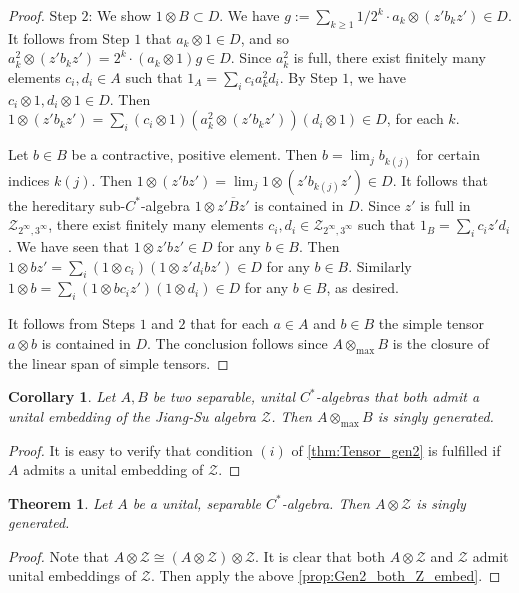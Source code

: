 \documentclass{amsart}
\newtheorem{thm}[thmCt]{Theorem}
\newtheorem{cor}[corCt]{Corollary}
\theoremstyle{definition}
\begin{document}
\begin{proof}
    Step $2$: We show $1\otimes B\subset D$.
    We have $g:=\sum_{k\geq 1} 1/2^k\cdot a_k\otimes (z'b_kz')\in D$.
    It follows from Step $1$ that $a_k\otimes 1\in D$, and so $a_k^2\otimes (z'b_kz')=2^k\cdot(a_k\otimes 1)g\in D$.
    Since $a_k^2$ is full, there exist finitely many elements $c_i,d_i\in A$ such that $1_A=\sum_ic_ia_k^2d_i$.
    By Step $1$, we have $c_i\otimes 1,d_i\otimes 1\in D$.
    Then $1\otimes (z'b_kz') = \sum_i(c_i\otimes 1) (a_k^2\otimes (z'b_kz')) (d_i\otimes 1)\in D$, for each $k$.

    Let $b\in B$ be a contractive, positive element.
    Then $b=\lim_j b_{k(j)}$ for certain indices $k(j)$.
    Then $1\otimes (z'bz') = \lim_j 1\otimes (z'b_{k(j)}z')\in D$.
    It follows that the hereditary sub-{{$C^*$-al\-ge\-bra}}{} $1\otimes \overline{z'Bz'}$ is contained in $D$.
    Since $z'$ is full in $\mathcal{Z}_{2^\infty,3^\infty}$, there exist finitely many elements $c_i,d_i\in \mathcal{Z}_{2^\infty,3^\infty}$ such that $1_B=\sum_ic_iz'd_i$.
    We have seen that $1\otimes z'bz'\in D$ for any $b\in B$.
    Then $1\otimes bz' = \sum_i (1\otimes c_i)(1\otimes z'd_ibz')\in D$ for any $b\in B$.
    Similarly $1\otimes b = \sum_i (1\otimes bc_iz')(1\otimes d_i)\in D$ for any $b\in B$, as desired.

    It follows from Steps $1$ and $2$ that for each $a\in A$ and $b\in B$ the simple tensor $a\otimes b$ is contained in $D$.
    The conclusion follows since $A\otimes_{\text{max}} B$ is the closure of the linear span of simple tensors.
\end{proof}

\begin{cor}
\label{prop:Gen2_both_Z_embed}
    Let $A, B$ be two separable, unital {{$C^*$-al\-ge\-bra}}{s} that both admit a unital embedding of the Jiang-Su algebra $\mathcal{Z}$.
    Then $A\otimes_{\text{max}} B$ is singly generated.
\end{cor}
\begin{proof}
    It is easy to verify that condition $(i)$ of \autoref{thm:Tensor_gen2} is fulfilled if $A$ admits a unital embedding of $\mathcal{Z}$.
\end{proof}

\begin{thm}
\label{prop:Gen2_Z-stable}
    Let $A$ be a unital, separable {{$C^*$-al\-ge\-bra}}{}.
    Then $A\otimes\mathcal{Z}$ is singly generated.
\end{thm}
\begin{proof}
    Note that $A\otimes\mathcal{Z}\cong (A\otimes\mathcal{Z})\otimes\mathcal{Z}$.
    It is clear that both $A\otimes\mathcal{Z}$ and $\mathcal{Z}$ admit unital embeddings of $\mathcal{Z}$.
    Then apply the above \autoref{prop:Gen2_both_Z_embed}.
\end{proof}
\end{document}
